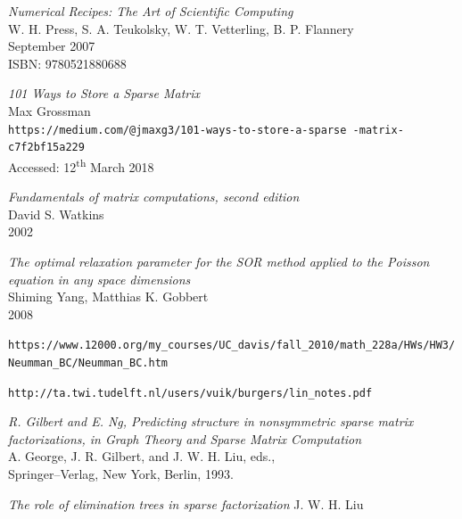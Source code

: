 \documentclass[a4paper]{article}
\begin{document}


\begin{thebibliography}{9}

		\emph{Numerical Recipes: The Art of Scientific Computing}\\
		W. H. Press, S. A. Teukolsky, W. T. Vetterling, B. P. Flannery\\
		September 2007\\
		ISBN: 9780521880688

		\emph{101 Ways to Store a Sparse Matrix}\\
		Max Grossman\\
		\texttt{https://medium.com/@jmaxg3/101-ways-to-store-a-sparse
		-matrix-c7f2bf15a229}\\
		Accessed: 12\textsuperscript{th} March 2018
        
    	\emph{Fundamentals of matrix computations,  second edition}\\
        David S. Watkins\\
        2002
        
    	\emph{The optimal relaxation parameter for the SOR method applied to the Poisson equation in any space dimensions}\\
	Shiming Yang, Matthias K. Gobbert\\
    2008
    
  			\verb!https://www.12000.org/my_courses/UC_davis/fall_2010/math_228a/HWs/HW3/Neumman_BC/Neumman_BC.htm!
            
  		\verb!http://ta.twi.tudelft.nl/users/vuik/burgers/lin_notes.pdf!
  
   		\emph{R. Gilbert and E. Ng, Predicting structure in nonsymmetric sparse matrix factorizations,
in Graph Theory and Sparse Matrix Computation}\\
	A. George, J. R. Gilbert, and J. W. H. Liu, eds.,\\
    Springer–Verlag, New York, Berlin, 1993.
    
   		\emph{The role of elimination trees in sparse factorization}
        J. W. H. Liu
        
    
    

\end{thebibliography}
\end{document}
